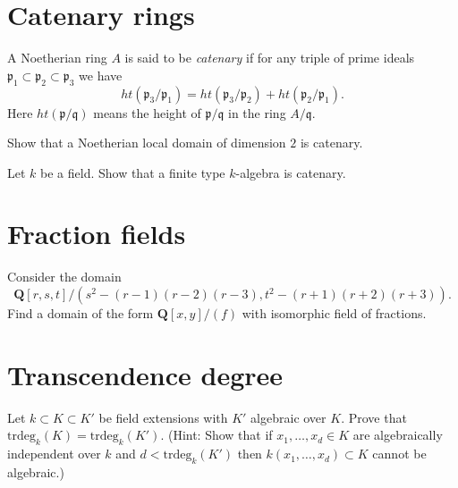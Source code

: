 \section{Catenary rings}
\label{section-catenary}

\begin{definition}
\label{definition-catenary}
A Noetherian ring $A$ is said to be {\it catenary}
if for any triple of prime ideals
${\mathfrak p}_1 \subset {\mathfrak p}_2 \subset {\mathfrak p}_3$
we have
$$
ht({\mathfrak p}_3 / {\mathfrak p}_1) = ht({\mathfrak p}_3/{\mathfrak p}_2) +
ht({\mathfrak p}_2/{\mathfrak p}_1).
$$
Here $ht(\mathfrak p/\mathfrak q)$ means the height of
$\mathfrak p/\mathfrak q$ in the ring $A/\mathfrak q$.
\end{definition}

\begin{exercise}
\label{exercise-Noetherian-local-domain-dim-2-catenary}
Show that a Noetherian local domain of dimension $2$ is catenary.
\end{exercise}

\begin{exercise}
\label{exercise-finite-type-over-field-catenary}
Let $k$ be a field.
Show that a finite type $k$-algebra is catenary.
\end{exercise}




\section{Fraction fields}
\label{section-fraction-fields}

\begin{exercise}
\label{exercise-find-fraction-field}
Consider the domain
$$
{\mathbf Q}[r, s, t]/(s^2-(r-1)(r-2)(r-3), t^2-(r + 1)(r + 2)(r + 3)).
$$
Find a domain of the form ${\mathbf Q}[x, y]/(f)$ with isomorphic
field of fractions.
\end{exercise}



\section{Transcendence degree}
\label{section-transcendence}

\begin{exercise}
\label{exercise-algebraic-extension}
Let $k \subset K \subset K'$ be field extensions with $K'$
algebraic over $K$. Prove that $\text{trdeg}_k(K) = \text{trdeg}_k(K')$.
(Hint: Show that if $x_1, \ldots, x_d \in K$ are algebraically independent
over $k$ and $d < \text{trdeg}_k(K')$ then $k(x_1, \ldots, x_d) \subset K$
cannot be algebraic.)
\end{exercise}






